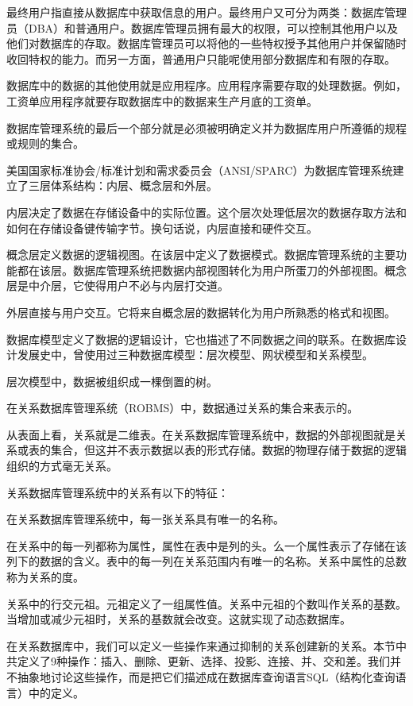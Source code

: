 最终用户指直接从数据库中获取信息的用户。最终用户又可分为两类：数据库管理员（DBA）和普通用户。数据库管理员拥有最大的权限，可以控制其他用户以及他们对数据库的存取。数据库管理员可以将他的一些特权授予其他用户并保留随时收回特权的能力。而另一方面，普通用户只能呢使用部分数据库和有限的存取。

数据库中的数据的其他使用就是应用程序。应用程序需要存取的处理数据。例如，工资单应用程序就要存取数据库中的数据来生产月底的工资单。

数据库管理系统的最后一个部分就是必须被明确定义并为数据库用户所遵循的规程或规则的集合。

美国国家标准协会/标准计划和需求委员会（ANSI/SPARC）为数据库管理系统建立了三层体系结构：内层、概念层和外层。

内层决定了数据在存储设备中的实际位置。这个层次处理低层次的数据存取方法和如何在存储设备键传输字节。换句话说，内层直接和硬件交互。

概念层定义数据的逻辑视图。在该层中定义了数据模式。数据库管理系统的主要功能都在该层。数据库管理系统把数据内部视图转化为用户所蛋刀的外部视图。概念层是中介层，它使得用户不必与内层打交道。

外层直接与用户交互。它将来自概念层的数据转化为用户所熟悉的格式和视图。

数据库模型定义了数据的逻辑设计，它也描述了不同数据之间的联系。在数据库设计发展史中，曾使用过三种数据库模型：层次模型、网状模型和关系模型。

层次模型中，数据被组织成一棵倒置的树。

在关系数据库管理系统（ROBMS）中，数据通过关系的集合来表示的。

从表面上看，关系就是二维表。在关系数据库管理系统中，数据的外部视图就是关系或表的集合，但这并不表示数据以表的形式存储。数据的物理存储于数据的逻辑组织的方式毫无关系。

关系数据库管理系统中的关系有以下的特征：

在关系数据库管理系统中，每一张关系具有唯一的名称。

在关系中的每一列都称为属性，属性在表中是列的头。么一个属性表示了存储在该列下的数据的含义。表中的每一列在关系范围内有唯一的名称。关系中属性的总数称为关系的度。

关系中的行交元祖。元祖定义了一组属性值。关系中元祖的个数叫作关系的基数。当增加或减少元祖时，关系的基数就会改变。这就实现了动态数据库。

在关系数据库中，我们可以定义一些操作来通过抑制的关系创建新的关系。本节中共定义了9种操作：插入、删除、更新、选择、投影、连接、并、交和差。我们并不抽象地讨论这些操作，而是把它们描述成在数据库查询语言SQL（结构化查询语言）中的定义。 

